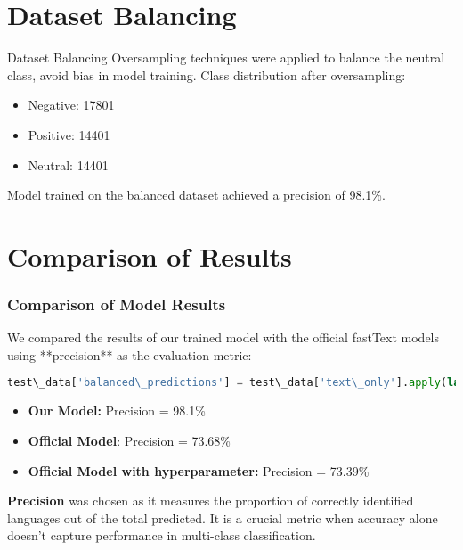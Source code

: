 \documentclass{beamer}
\begin{document}
\section{Dataset Balancing}
\begin{frame}{Dataset Balancing}
Oversampling techniques were applied to balance the neutral class, avoid bias in model training. Class distribution after oversampling:
\begin{itemize}
    \item Negative: 17801
    \item Positive: 14401
    \item Neutral: 14401
\end{itemize}
Model trained on the balanced dataset achieved a precision of 98.1\%.
\end{frame}

\section{Comparison of Results}
\begin{frame}[fragile]
    \frametitle{Comparison of Model Results}
    We compared the results of our trained model with the official fastText models using **precision** as the evaluation metric:

    \begin{lstlisting}[language=python]
    test\_data['balanced\_predictions'] = test\_data['text\_only'].apply(lambda x: balanced\_model.predict(x)[0][0])
    \end{lstlisting}

    \begin{itemize}
        \item \textbf{Our Model:} Precision = 98.1\%
        \item \textbf{Official Model}: Precision = 73.68\%
        \item \textbf{Official Model with hyperparameter:} Precision = 73.39\%
    \end{itemize}
    
    \textbf{Precision} was chosen as it measures the proportion of correctly identified languages out of the total predicted. It is a crucial metric when accuracy alone doesn't capture performance in multi-class classification.
\end{frame}
\end{document}

